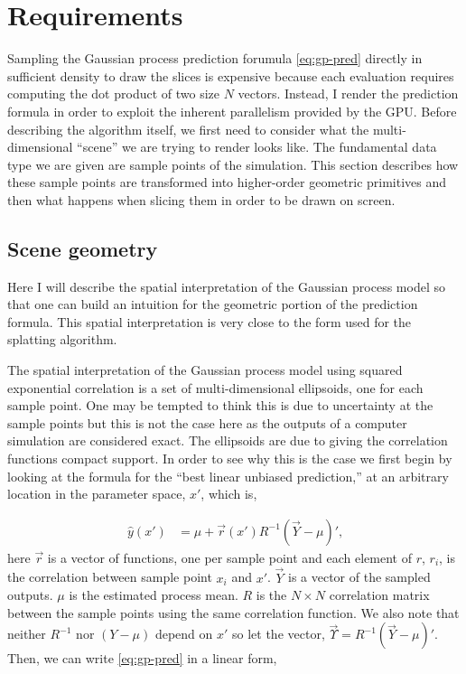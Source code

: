 \section{Requirements}
\label{sec:requirements}

Sampling the Gaussian process prediction forumula \autoref{eq:gp-pred} directly
in sufficient density to draw the slices is expensive because each evaluation
requires computing the dot product of two size $N$ vectors.  Instead, I render
the prediction formula in order to exploit the inherent parallelism provided by
the GPU. Before describing the algorithm itself, we first need to consider what
the multi-dimensional ``scene'' we are trying to render looks like.  The
fundamental data type we are given are sample points of the simulation.  This
section describes how these sample points are transformed into higher-order
geometric primitives and then what happens when slicing them in order to be
drawn on screen.

\subsection{Scene geometry}
\label{sec:scene_geometry}

Here I will describe the spatial interpretation of the Gaussian process
model so that one can build an intuition for the geometric portion of the 
prediction formula.  This spatial interpretation is very close to the 
form used for the splatting algorithm.

The spatial interpretation of the Gaussian process model using squared 
exponential correlation is a set of 
multi-dimensional ellipsoids, one for each sample point. 
One may be tempted to think this is due to uncertainty at the sample points
but this is not the case here as the outputs of a computer simulation are
considered exact. The ellipsoids are due to giving the correlation functions
compact support.
In order to see
why this is the case we first begin by looking at the formula for the 
``best linear unbiased prediction,''
at an arbitrary location
in the parameter space, $x'$, which is,

\begin{align}
  \hat{y}(x') &= \mu + \vec{r}(x') R^{-1} (\vec{Y} - \mu)' \text{,}
  \label{eq:gp-pred}
\end{align}
here $\vec{r}$ is a vector of functions, one per sample point
and each element of $r$, $r_i$, is the correlation 
between
sample point $x_i$ and $x'$.  
$\vec{Y}$ is a vector of the sampled outputs.
$\mu$ is the estimated process mean.
$R$ is 
the $N \times N$ correlation matrix 
between the sample points using the same correlation function.
We also note that neither $R^{-1}$ nor $(Y - \mu)$
depend on $x'$ so let the vector, 
$\vec{\Upsilon} = R^{-1} (\vec{Y} - \mu)'$.  
Then, we can write \autoref{eq:gp-pred} in a linear form,

